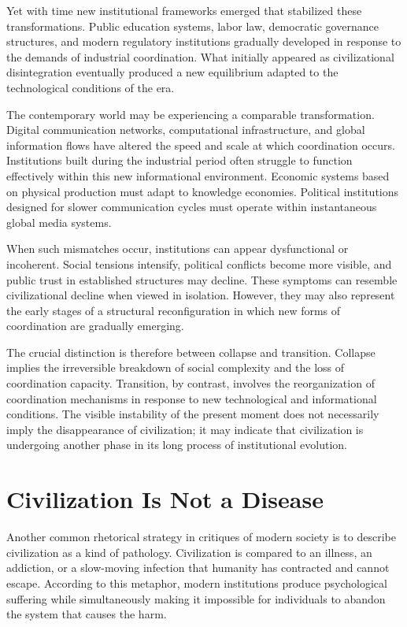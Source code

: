 \documentclass[12pt]{article}
\begin{document}
Yet with time new institutional frameworks emerged that stabilized these transformations. Public education systems, labor law, democratic governance structures, and modern regulatory institutions gradually developed in response to the demands of industrial coordination. What initially appeared as civilizational disintegration eventually produced a new equilibrium adapted to the technological conditions of the era.

The contemporary world may be experiencing a comparable transformation. Digital communication networks, computational infrastructure, and global information flows have altered the speed and scale at which coordination occurs. Institutions built during the industrial period often struggle to function effectively within this new informational environment. Economic systems based on physical production must adapt to knowledge economies. Political institutions designed for slower communication cycles must operate within instantaneous global media systems.

When such mismatches occur, institutions can appear dysfunctional or incoherent. Social tensions intensify, political conflicts become more visible, and public trust in established structures may decline. These symptoms can resemble civilizational decline when viewed in isolation. However, they may also represent the early stages of a structural reconfiguration in which new forms of coordination are gradually emerging.

The crucial distinction is therefore between collapse and transition. Collapse implies the irreversible breakdown of social complexity and the loss of coordination capacity. Transition, by contrast, involves the reorganization of coordination mechanisms in response to new technological and informational conditions. The visible instability of the present moment does not necessarily imply the disappearance of civilization; it may indicate that civilization is undergoing another phase in its long process of institutional evolution.

\section{Civilization Is Not a Disease}

Another common rhetorical strategy in critiques of modern society is to describe civilization as a kind of pathology. Civilization is compared to an illness, an addiction, or a slow-moving infection that humanity has contracted and cannot escape. According to this metaphor, modern institutions produce psychological suffering while simultaneously making it impossible for individuals to abandon the system that causes the harm.
\end{document}
